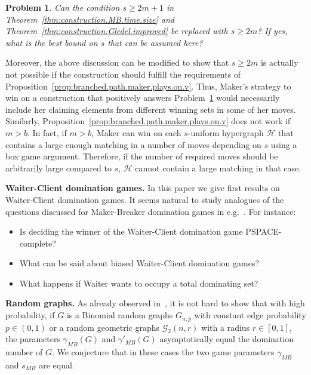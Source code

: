 \documentclass[reqno, 12pt]{amsart}
\numberwithin{equation}{section}
\numberwithin{figure}{section}
\newtheorem{problem}[theorem]{Problem}
\begin{document}
\begin{problem}\label{problem:smaller.sets}
Can the condition $s\geq 2m+1$ in Theorem~\ref{thm:construction.MB.time.size} and
Theorem~\ref{thm:construction.Gledel.improved} be replaced
with $s\geq 2m$? If yes, what is the best bound on $s$
that can be assumed here?
\end{problem}

Moreover, the above discussion can be modified to show that $s \geq 2m$ is actually not possible if the construction should fulfill the requirements of Proposition~\ref{prop:branched.path.maker.plays.on.v}. Thus, Maker's strategy to win on a construction that positively answers Problem~\ref{problem:smaller.sets} would necessarily include her claiming elements from different winning sets in some of her moves. Similarly, Proposition~\ref{prop:branched.path.maker.plays.on.v} does not work if $m > b$. In fact, if $m > b$, Maker can win on each $s$-uniform hypergraph $\mathcal{H}$ that contains a large enough matching in a number of moves depending on $s$ using a box game argument. Therefore, if the number of required moves should be arbitrarily large compared to $s$, $\mathcal{H}$ cannot contain a large matching in that case.
\medskip

\textbf{Waiter-Client domination games.}
In this paper we give first results on Waiter-Client domination games. It seems natural to study analogues of the questions discussed for Maker-Breaker domination games in e.g.~\cite{bagdas2024biased,brevsar2025thresholds,
bujtas2025criticality,divakaran2025maker,dokyeesun2023maker,duchene2020maker}. 
For instance: 
\begin{itemize}
\item Is deciding the winner of the Waiter-Client domination game  PSPACE-complete? 
\item What can be said about biased Waiter-Client domination games? 
\item What happens if Waiter wants to occupy a total dominating set? \end{itemize}



\medskip

\textbf{Random graphs.} As already observed in~\cite{bagdas2024biased}, 
it is not hard to show that with high probability,
if $G$ is a Binomial random graphs $G_{n,p}$ with
constant edge probability $p\in (0,1)$ 
or a random geometric graphs $\mathcal{G}_2(n,r)$ with a radius 
$r\in [0,1]$, 
the parameters $\gamma_{MB}(G)$ and $\gamma'_{MB}(G)$ 
asymptotically equal the domination number of $G$. 
We conjecture that in these cases the two game parameters 
$\gamma_{MB}$ and $s_{MB}$ are equal.
\end{document}

